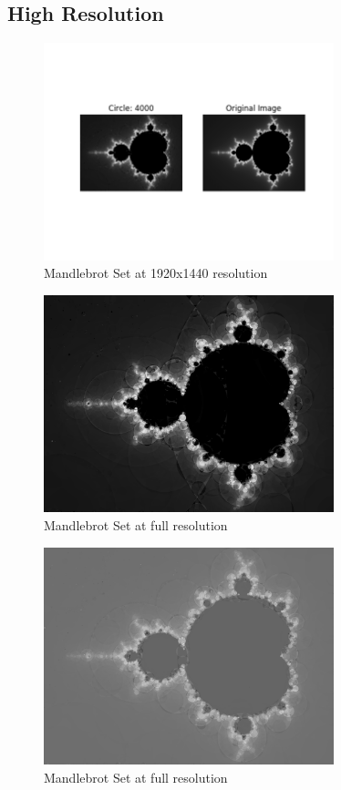 \documentclass[12pt]{article}
\begin{document}
\newpage
\subsection*{High Resolution}
\begin{figure}[H]
\centering
\noindent\includegraphics[width=0.75\textwidth]{../results/mandlebrot/mandlebrot_4000}
\caption{Mandlebrot Set at 1920x1440 resolution}
\label{fig:mandlebrot}
\end{figure}

\begin{figure}[H]
\centering
\noindent\includegraphics[width=0.75\textwidth]{../results/mandlebrot/mandlebrot_raw_4000}
\caption{Mandlebrot Set at full resolution}
\label{fig:mandlebrot_raw}
\end{figure}

\begin{figure}[H]
\centering
\noindent\includegraphics[width=0.75\textwidth]{../results/mandlebrot/mandlebrot_raw_wrong_4000}
\caption{Mandlebrot Set at full resolution}
\label{fig:mandlebrot_raw_wrong}
\end{figure}
\end{document}
